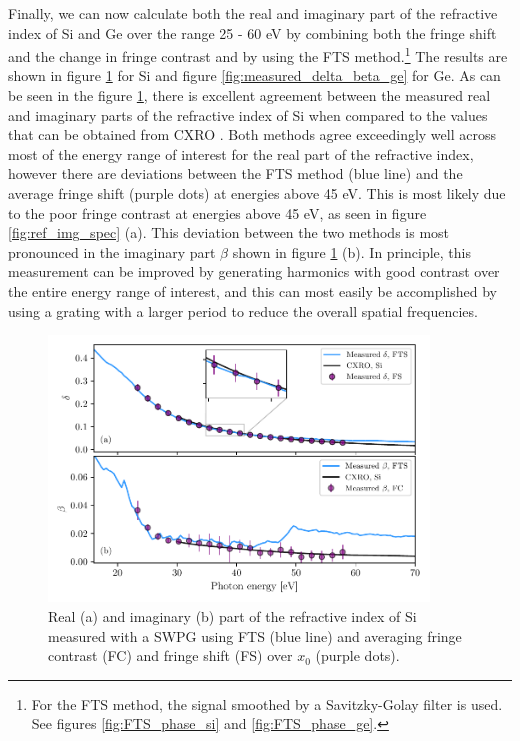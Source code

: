 Finally, we can now calculate both the real and imaginary part of the refractive index of Si and Ge over the range 25 - 60 eV by combining both the fringe shift and the change in fringe contrast and by using the FTS method.\footnote{For the FTS method, the signal smoothed by a Savitzky-Golay filter is used. See figures \ref{fig:FTS_phase_si} and \ref{fig:FTS_phase_ge}.}  The results are shown in figure \ref{fig:measured_delta_beta} for Si and figure \ref{fig:measured_delta_beta_ge} for Ge.  As can be seen in the figure \ref{fig:measured_delta_beta}, there is excellent agreement between the measured real and imaginary parts of the refractive index of Si when compared to the values that can be obtained from CXRO \cite{henkeXRayInteractionsPhotoabsorption1993}.  Both methods agree exceedingly well across most of the energy range of interest for the real part of the refractive index, however there are deviations between the FTS method (blue line) and the average fringe shift (purple dots) at energies above 45 eV.  This is most likely due to the poor fringe contrast at energies above 45 eV, as seen in figure \ref{fig:ref_img_spec} (a).  This deviation between the two methods is most pronounced in the imaginary part $\beta$ shown in figure \ref{fig:measured_delta_beta} (b).  In principle, this measurement can be improved by generating harmonics with good contrast over the entire energy range of interest, and this can most easily be accomplished by using a grating with a larger period to reduce the overall spatial frequencies.

\begin{figure}
	\centering
	\includegraphics[width=0.9\textwidth]{figures/refractive_index/db_cxro.pdf}
	\caption[Measured real and imaginary part of the refractive index of Si using a SWPG]{Real (a) and imaginary (b) part of the refractive index of Si measured with a SWPG using FTS (blue line) and averaging fringe contrast (FC) and fringe shift (FS) over $x_0$ (purple dots).}
	\label{fig:measured_delta_beta}
\end{figure}

